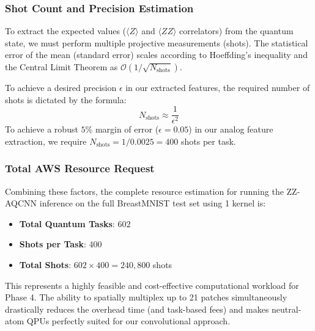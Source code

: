 \documentclass{oqireport}
\begin{document}
\subsubsection{Shot Count and Precision Estimation}
To extract the expected values ($\langle Z \rangle$ and $\langle ZZ \rangle$ correlators) from the quantum state, we must perform multiple projective measurements (shots). The statistical error of the mean (standard error) scales according to Hoeffding's inequality and the Central Limit Theorem as $\mathcal{O}(1/\sqrt{N_{\text{shots}}})$.

To achieve a desired precision $\epsilon$ in our extracted features, the required number of shots is dictated by the formula:
\begin{equation}
    N_{\text{shots}} \approx \frac{1}{\epsilon^2}
\end{equation}
To achieve a robust $5\%$ margin of error ($\epsilon = 0.05$) in our analog feature extraction, we require $N_{\text{shots}} = 1 / 0.0025 = 400$ shots per task.

\subsubsection{Total AWS Resource Request}
Combining these factors, the complete resource estimation for running the ZZ-AQCNN inference on the full BreastMNIST test set using 1 kernel is:
\begin{itemize}
    \item \textbf{Total Quantum Tasks}: $602$
    \item \textbf{Shots per Task}: $400$
    \item \textbf{Total Shots}: $602 \times 400 = 240,800$ shots
\end{itemize}
This represents a highly feasible and cost-effective computational workload for Phase 4. The ability to spatially multiplex up to 21 patches simultaneously drastically reduces the overhead time (and task-based fees) and makes neutral-atom QPUs perfectly suited for our convolutional approach.


\end{document}
